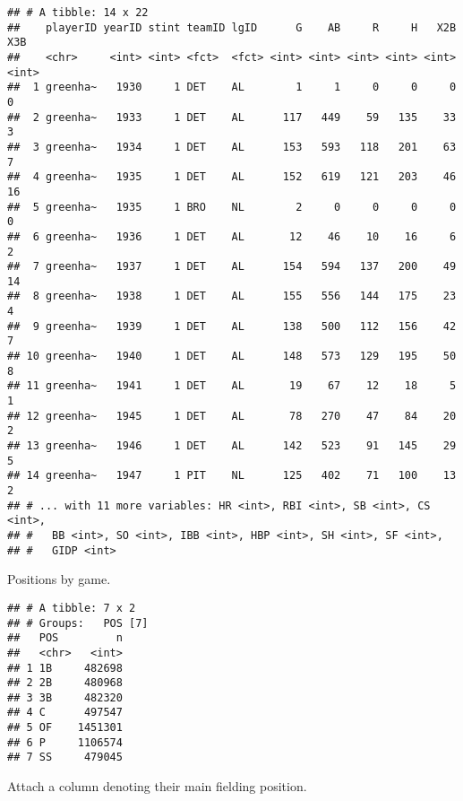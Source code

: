 \documentclass[]{book}
\newenvironment{Shaded}{\begin{snugshade}}{\end{snugshade}}
\newcommand{\KeywordTok}[1]{\textcolor[rgb]{0.13,0.29,0.53}{\textbf{#1}}}
\newcommand{\DataTypeTok}[1]{\textcolor[rgb]{0.13,0.29,0.53}{#1}}
\newcommand{\StringTok}[1]{\textcolor[rgb]{0.31,0.60,0.02}{#1}}
\newcommand{\OperatorTok}[1]{\textcolor[rgb]{0.81,0.36,0.00}{\textbf{#1}}}
\newcommand{\NormalTok}[1]{#1}
\begin{document}
\begin{verbatim}
## # A tibble: 14 x 22
##    playerID yearID stint teamID lgID      G    AB     R     H   X2B   X3B
##    <chr>     <int> <int> <fct>  <fct> <int> <int> <int> <int> <int> <int>
##  1 greenha~   1930     1 DET    AL        1     1     0     0     0     0
##  2 greenha~   1933     1 DET    AL      117   449    59   135    33     3
##  3 greenha~   1934     1 DET    AL      153   593   118   201    63     7
##  4 greenha~   1935     1 DET    AL      152   619   121   203    46    16
##  5 greenha~   1935     1 BRO    NL        2     0     0     0     0     0
##  6 greenha~   1936     1 DET    AL       12    46    10    16     6     2
##  7 greenha~   1937     1 DET    AL      154   594   137   200    49    14
##  8 greenha~   1938     1 DET    AL      155   556   144   175    23     4
##  9 greenha~   1939     1 DET    AL      138   500   112   156    42     7
## 10 greenha~   1940     1 DET    AL      148   573   129   195    50     8
## 11 greenha~   1941     1 DET    AL       19    67    12    18     5     1
## 12 greenha~   1945     1 DET    AL       78   270    47    84    20     2
## 13 greenha~   1946     1 DET    AL      142   523    91   145    29     5
## 14 greenha~   1947     1 PIT    NL      125   402    71   100    13     2
## # ... with 11 more variables: HR <int>, RBI <int>, SB <int>, CS <int>,
## #   BB <int>, SO <int>, IBB <int>, HBP <int>, SH <int>, SF <int>,
## #   GIDP <int>
\end{verbatim}

Positions by game.

\begin{Shaded}
\end{Shaded}

\begin{verbatim}
## # A tibble: 7 x 2
## # Groups:   POS [7]
##   POS         n
##   <chr>   <int>
## 1 1B     482698
## 2 2B     480968
## 3 3B     482320
## 4 C      497547
## 5 OF    1451301
## 6 P     1106574
## 7 SS     479045
\end{verbatim}

Attach a column denoting their main fielding position.
\end{document}
